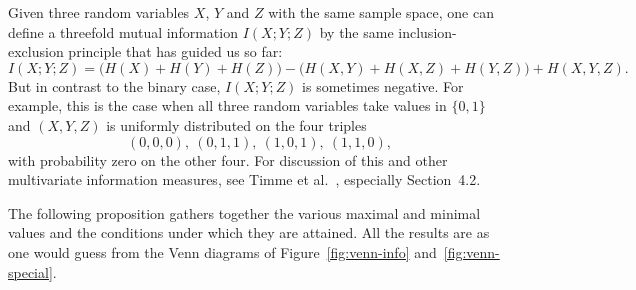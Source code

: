 \begin{remark}
Given three random variables $X$, $Y$ and $Z$ with the same sample
space, one can define a threefold%
% 
% 
mutual information $I(X; Y; Z)$ by the same inclusion-exclusion principle
that has guided us so far:
\[
I(X; Y; Z) 
=
\bigl( H(X) + H(Y) + H(Z) \bigr) 
-
\bigl( H(X, Y) + H(X, Z) + H(Y, Z) \bigr)
+
H(X, Y, Z).
\]
But in contrast to the binary case, $I(X; Y; Z)$ is sometimes
negative.  For example, this is the case when all three random variables
take values in $\{0, 1\}$ and $(X, Y, Z)$ is uniformly distributed on the
four triples
\[
(0, 0, 0), \ (0, 1, 1), \ (1, 0, 1), \ (1, 1, 0),
\]
with probability zero on the other four.  For discussion of this and other
multivariate information measures, see Timme et al.~\cite{TAFB}, especially
Section~4.2.
\end{remark}

The following proposition gathers together the various maximal and minimal
values and the conditions under which they are attained.  All the results
are as one would guess from the Venn diagrams of Figure~\ref{fig:venn-info}
and~\ref{fig:venn-special}. 

